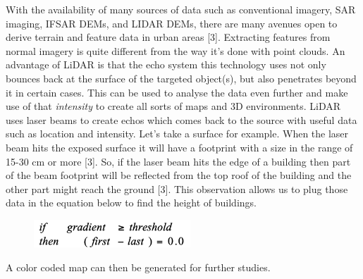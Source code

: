 \documentclass[12pt]{report}
\begin{document}
\vspace{\baselineskip}
With the availability of many sources of data such as conventional imagery, SAR imaging, IFSAR DEMs, and LIDAR DEMs, there are many avenues open to derive terrain and feature data in urban areas [3]. Extracting features from normal imagery is quite different from the way it’s done with point clouds. An advantage of LiDAR is that the echo system this technology uses not only bounces back at the surface of the targeted object(s), but also penetrates beyond it in certain cases. This can be used to analyse the data even further and make use of that \textit{intensity} to create all sorts of maps and 3D environments. LiDAR uses laser beams to create echos which comes back to the source with useful data such as location and intensity. Let’s take a surface for example. When the laser beam hits the exposed surface it will have a footprint with a size in the range of 15-30 cm or more [3]. So, if the laser beam hits the edge of a building then part of the beam footprint will be reflected from the top roof of the building and the other part might reach the ground [3]. This observation allows us to plug those data in the equation below to find the height of buildings.\par




\begin{figure}[H]
	\begin{Center}
		\includegraphics[width=2.31in,height=0.41in]{./media/image1.png}
	\end{Center}
\end{figure}



\par


\vspace{\baselineskip}
A color coded map can then be generated for further studies.\par


\vspace{\baselineskip}


\end{document}
